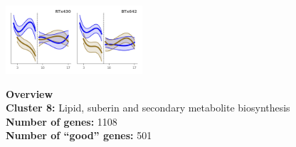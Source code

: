 \begin{multicols}{2}
\includegraphics[width=2in]{figures/clusters/root_Preflowering_7.png}
\columnbreak

\noindent \textbf{Overview}\\\textbf{Cluster 8:} Lipid, suberin and secondary metabolite biosynthesis \\
\textbf{Number of genes:} 1108 \\
\textbf{Number of ``good'' genes:} 501 \\
\end{multicols}


